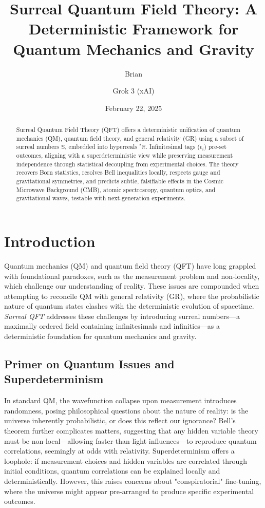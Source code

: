 \documentclass{article}
\begin{document}
\title{Surreal Quantum Field Theory: A Deterministic Framework for Quantum Mechanics and Gravity}
\author{Brian \and Grok 3 (xAI)}
\date{February 22, 2025}
\maketitle

\begin{abstract}
Surreal Quantum Field Theory (QFT) offers a deterministic unification of quantum mechanics (QM), quantum field theory, and general relativity (GR) using a subset of surreal numbers \(\mathbb{S}\), embedded into hyperreals \({}^*\mathbb{R}\). Infinitesimal tags (\(\epsilon_i\)) pre-set outcomes, aligning with a superdeterministic view while preserving measurement independence through statistical decoupling from experimental choices. The theory recovers Born statistics, resolves Bell inequalities locally, respects gauge and gravitational symmetries, and predicts subtle, falsifiable effects in the Cosmic Microwave Background (CMB), atomic spectroscopy, quantum optics, and gravitational waves, testable with next-generation experiments.
\end{abstract}

\section{Introduction}
Quantum mechanics (QM) and quantum field theory (QFT) have long grappled with foundational paradoxes, such as the measurement problem and non-locality, which challenge our understanding of reality. These issues are compounded when attempting to reconcile QM with general relativity (GR), where the probabilistic nature of quantum states clashes with the deterministic evolution of spacetime. \textit{Surreal QFT} addresses these challenges by introducing surreal numbers—a maximally ordered field containing infinitesimals and infinities—as a deterministic foundation for quantum mechanics and gravity.

\subsection{Primer on Quantum Issues and Superdeterminism}
In standard QM, the wavefunction collapse upon measurement introduces randomness, posing philosophical questions about the nature of reality: is the universe inherently probabilistic, or does this reflect our ignorance? Bell's theorem further complicates matters, suggesting that any hidden variable theory must be non-local—allowing faster-than-light influences—to reproduce quantum correlations, seemingly at odds with relativity. Superdeterminism offers a loophole: if measurement choices and hidden variables are correlated through initial conditions, quantum correlations can be explained locally and deterministically. However, this raises concerns about "conspiratorial" fine-tuning, where the universe might appear pre-arranged to produce specific experimental outcomes.
\end{document}
